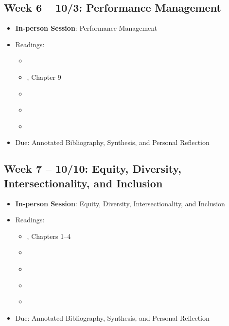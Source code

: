 \documentclass[12pt, letterpaper]{article}
\begin{document}
\subsection*{Week 6 -- 10/3: Performance Management}
\begin{itemize}
    \item \textbf{In-person Session}: Performance Management
    \item Readings:
    \begin{itemize}
        \item \cite{Behn2003}
        \item \cite{Denhardt2015}, Chapter 9
        \item \cite{Douglas2021}
        \item \cite{marvel2015}
        \item \cite{nicholson-crotty2004}
    \end{itemize}
    \item Due: Annotated Bibliography, Synthesis, and Personal Reflection
\end{itemize}

\subsection*{Week 7 -- 10/10: Equity, Diversity, Intersectionality, and Inclusion}
\begin{itemize}
    \item \textbf{In-person Session}: Equity, Diversity, Intersectionality, and Inclusion
    \item Readings:
    \begin{itemize}
        \item \cite{Gooden2014}, Chapters 1--4
        \item \cite{mccandless2022}
        \item \cite{jiang2022}
        \item \cite{marvel2015}
        \item \cite{Robles2023}
    \end{itemize}
    \item Due: Annotated Bibliography, Synthesis, and Personal Reflection
\end{itemize}
\end{document}
